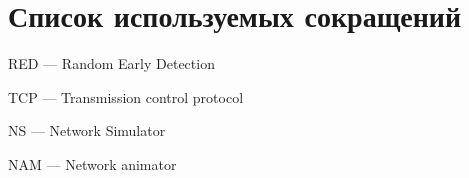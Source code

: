 \chapter*{Список используемых сокращений}

\mbox{}

RED --- Random Early Detection

TCP --- Transmission control protocol

NS  --- Network Simulator

NAM --- Network animator


